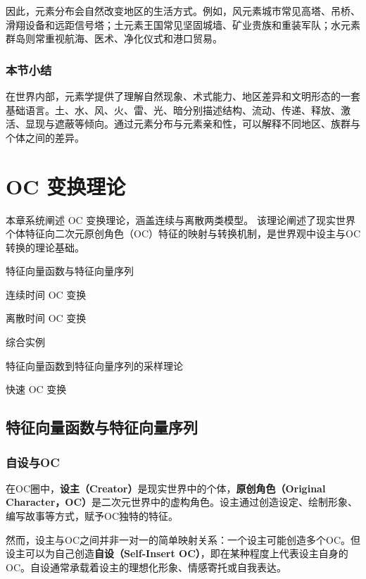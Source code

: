 因此，元素分布会自然改变地区的生活方式。例如，风元素城市常见高塔、吊桥、滑翔设备和远距信号塔；土元素王国常见坚固城墙、矿业贵族和重装军队；水元素群岛则常重视航海、医术、净化仪式和港口贸易。

\subsubsection{本节小结}

在\wkn{}世界内部，元素学提供了理解自然现象、术式能力、地区差异和文明形态的一套基础语言。土、水、风、火、雷、光、暗分别描述结构、流动、传递、释放、激活、显现与遮蔽等倾向。通过元素分布与元素亲和性，可以解释不同地区、族群与个体之间的差异。

\section{OC 变换理论}\label{sec:octheory}

本章系统阐述 OC 变换理论，涵盖连续与离散两类模型。
该理论阐述了现实世界个体特征向二次元原创角色（OC）特征的映射与转换机制，是世界观中设主与OC转换的理论基础。
\begin{introduction}
    \item 特征向量函数与特征向量序列
    \item 连续时间 OC 变换
    \item 离散时间 OC 变换
    \item 综合实例
    \item 特征向量函数到特征向量序列的采样理论
    \item 快速 OC 变换
\end{introduction}

\subsection{特征向量函数与特征向量序列}

\subsubsection{自设与OC}
在OC圈中，\textbf{设主（Creator）}是现实世界中的个体，\textbf{原创角色（Original Character，OC）}是二次元世界中的虚构角色。设主通过创造设定、绘制形象、编写故事等方式，赋予OC独特的特征。

然而，设主与OC之间并非一对一的简单映射关系：一个设主可能创造多个OC。但设主可以为自己创造\textbf{自设（Self-Insert OC）}，即在某种程度上代表设主自身的OC。自设通常承载着设主的理想化形象、情感寄托或自我表达。

